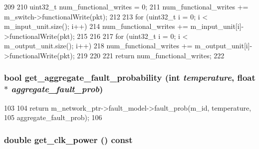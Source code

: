 \begin{DoxyCode}
209 {
210     uint32_t num_functional_writes = 0;
211     num_functional_writes += m_switch->functionalWrite(pkt);
212 
213     for (uint32_t i = 0; i < m_input_unit.size(); i++) {
214         num_functional_writes += m_input_unit[i]->functionalWrite(pkt);
215     }
216 
217     for (uint32_t i = 0; i < m_output_unit.size(); i++) {
218         num_functional_writes += m_output_unit[i]->functionalWrite(pkt);
219     }
220 
221     return num_functional_writes;
222 }
\end{DoxyCode}
\hypertarget{classRouter__d_ae994f84621b36472148c41e017b4e78b}{
\subsubsection[{get\_\-aggregate\_\-fault\_\-probability}]{\setlength{\rightskip}{0pt plus 5cm}bool get\_\-aggregate\_\-fault\_\-probability (int {\em temperature}, \/  float $\ast$ {\em aggregate\_\-fault\_\-prob})}}
\label{classRouter__d_ae994f84621b36472148c41e017b4e78b}



\begin{DoxyCode}
103                                                                      {
104         return m_network_ptr->fault_model->fault_prob(m_id, temperature, 
105                                                       aggregate_fault_prob);
106     }
\end{DoxyCode}
\hypertarget{classRouter__d_aaed4e89d3af8d4de26d6a9af17cff0f1}{
\subsubsection[{get\_\-clk\_\-power}]{\setlength{\rightskip}{0pt plus 5cm}double get\_\-clk\_\-power () const}}
\label{classRouter__d_aaed4e89d3af8d4de26d6a9af17cff0f1}



